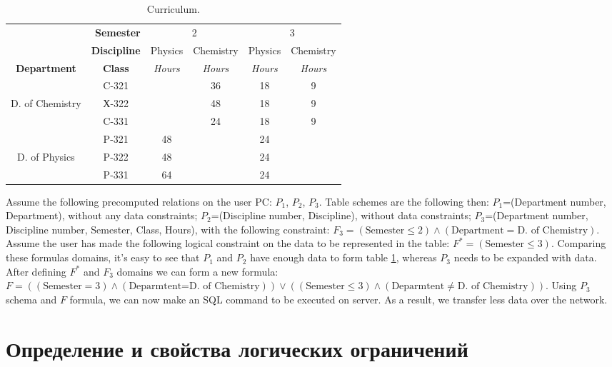 \documentclass[10pt,a4paper]{article}
\begin{document}
\begin{table}[h!]
\caption{\label{def_T_1} Curriculum.}
\begin{center}
\begin{tabular}{|c|c||c|c|c|c|}
\cline{2-6}
\multicolumn{1}{c|}{} & \multicolumn{1}{|r||}{\bf Semester} & \multicolumn{2}{|c|}{2} & \multicolumn{2}{|c|}{3}  \\
\cline{2-6}
\multicolumn{1}{c|}{} & {\bf Discipline} & Physics & Chemistry & Physics & Chemistry \\
\hline \cline{2-6}
{\bf Department} & {\bf Class} & {\it Hours} & {\it Hours} & {\it Hours} & {\it Hours} \\
\hline
 & C-321 & & 36 & 18 & 9 \\
\cline{2-6}
D. of Chemistry & Х-322 & & 48 & 18 & 9 \\
\cline{2-6}
 & C-331 & & 24 & 18 & 9 \\
\hline
 & P-321 & 48 & & 24 & \\
\cline{2-6}
D. of Physics & P-322 & 48 & & 24 & \\
\cline{2-6}
 & P-331 & 64 & & 24 & \\
\hline
\end{tabular}
\end{center}
\end{table}
Assume the following precomputed relations on the user PC:  $P_1$,
$P_2$, $P_3$. Table schemes are the following then: $P_1$=(Department number, Department), without any data constraints; $P_2$=(Discipline number, Discipline), without data constraints; $P_3$=(Department number, Discipline number, Semester, Class, Hours), with the following constraint:
$F_3 =(\mbox{Semester} \leq 2) \wedge (\mbox{Department} = \mbox{D. of Chemistry})$.
Assume the user has made the following logical constraint on the data to be represented in the table: $F^{\ast} = (\mbox{Semester} \leq 3)$. Comparing these formulas domains, it's easy to see that $P_1$ and $P_2$ have enough data to form table \ref{def_T_1}, whereas $P_3$ needs to be expanded with data. After defining $F^{\ast}$ and $F_3$ domains we can form a new formula: $F=((\mbox{Semester} = 3) \wedge (\mbox{Deparmtent=D. of Chemistry}))
\vee ((\mbox{Semester} \leq 3) \wedge (\mbox{Deparmtent} \neq \mbox{D. of Chemistry}))$. Using $P_3$ schema and $F$ formula, we can now make an SQL command to be executed on server. As a result, we transfer less data over the network.

\section{Определение и свойства логических ограничений}
\end{document}
